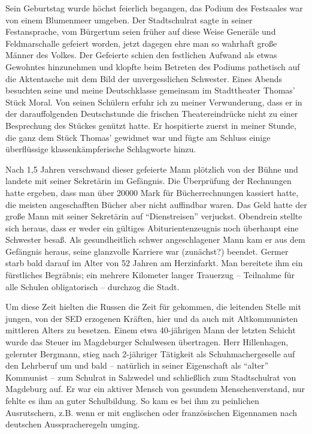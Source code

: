 Sein Geburtstag wurde höchst feierlich begangen, das Podium des Festsaales war von einem Blumenmeer umgeben. Der Stadtschulrat sagte in seiner Festansprache, vom Bürgertum seien früher auf diese Weise Generäle und Feldmarschalle gefeiert worden, jetzt dagegen ehre man so wahrhaft große Männer des Volkes. Der Gefeierte schien den festlichen Aufwand als etwas Gewohntes hinzunehmen und klopfte beim Betreten des Podiums pathetisch auf die Aktentasche mit dem Bild der unvergesslichen Schwester.  Eines Abends besuchten seine und meine Deutschklasse gemeinsam im Stadttheater Thomas' Stück Moral. Von seinen Schülern erfuhr ich zu meiner Verwunderung, dass er in der darauffolgenden Deutschstunde die frischen Theatereindrücke nicht zu einer Besprechung des Stückes genützt hatte. Er hospitierte zuerst in meiner Stunde, die ganz dem Stück Thomas' gewidmet war und fügte am Schluss einige überflüssige klassenkämpferische Schlagworte hinzu.

Nach 1,5 Jahren verschwand dieser gefeierte Mann plötzlich von der Bühne und landete mit seiner Sekretärin im Gefängnis. Die Überprüfung der Rechnungen hatte ergeben, dass man über \num{20000} Mark für Bücherrechnungen kassiert hatte, die meisten angeschafften Bücher aber nicht auffindbar waren. Das Geld hatte der große Mann mit seiner Sekretärin auf \enquote{Dienstreisen} verjuckst. Obendrein stellte sich heraus, dass er weder ein gültiges Abiturientenzeugnis noch überhaupt eine Schwester besaß. Als gesundheitlich schwer angeschlagener Mann kam er aus dem Gefängnis heraus, seine glanzvolle Karriere war (zunächst?) beendet. Germer starb bald darauf im Alter von 52 Jahren am Herzinfarkt. Man bereitete ihm  ein fürstliches Begräbnis; ein mehrere Kilometer langer Trauerzug -- Teilnahme für alle Schulen obligatorisch -- durchzog die Stadt.

Um diese Zeit hielten die Russen die Zeit für gekommen, die leitenden Stelle mit jungen, von der SED erzogenen Kräften, hier und da auch mit Altkommunisten mittleren Alters zu besetzen. Einem etwa 40-jährigen Mann der letzten Schicht wurde das Steuer im Magdeburger Schulwesen übertragen. Herr Hillenhagen, gelernter Bergmann, stieg nach 2-jähriger Tätigkeit als Schuhmachergeselle auf den Lehrberuf um und bald -- natürlich in seiner Eigenschaft als \enquote{alter} Kommunist -- zum Schulrat in Salzwedel und schließlich zum Stadtschulrat von Magdeburg auf. Er war ein aktiver Mensch von gesundem Menschenverstand, nur fehlte es ihm an guter Schulbildung. So kam es bei ihm zu peinlichen Ausrutschern, z.B. wenn er mit englischen oder französischen Eigennamen nach deutschen Ausspracheregeln umging.

